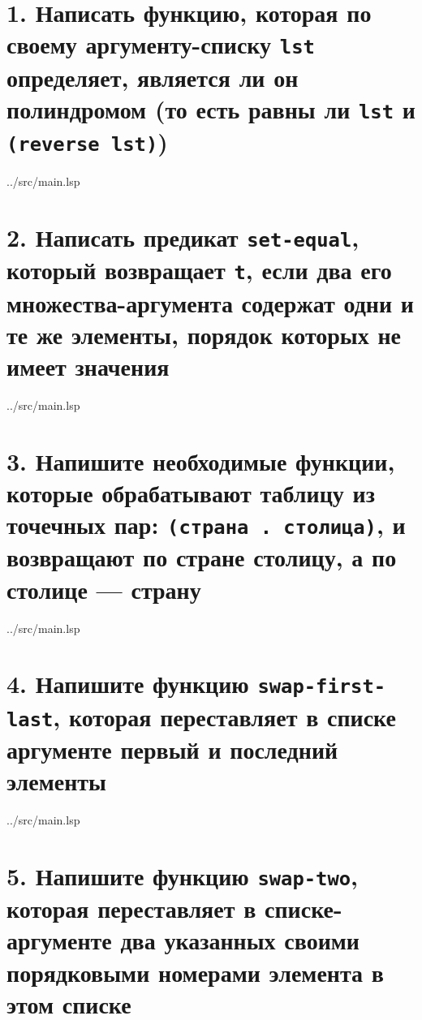 \section*{1. Написать функцию, которая по своему аргументу-списку \texttt{lst} определяет, является ли он полиндромом (то есть равны ли \texttt{lst} и \texttt{(reverse lst)})}

\begin{lstinputlisting}[
	caption={Задание 1},
	label={lst:t1},
	style={lsp},
	linerange={1-2},
	]{../src/main.lsp}
\end{lstinputlisting}

\section*{2. Написать предикат \texttt{set-equal}, который возвращает \texttt{t}, если два его множества-аргумента содержат одни и те же элементы, порядок которых не имеет значения}

\begin{lstinputlisting}[
	caption={Задание 2},
	label={lst:t2},
	style={lsp},
	linerange={4-5},
	]{../src/main.lsp}
\end{lstinputlisting}

\section*{3. Напишите необходимые функции, которые обрабатывают таблицу из точечных пар: \texttt{(страна . столица)}, и возвращают по стране столицу, а по столице --- страну}

\clearpage

\begin{lstinputlisting}[
	caption={Задание 3},
	label={lst:t3},
	style={lsp},
	linerange={7-13},
	]{../src/main.lsp}
\end{lstinputlisting}

\section*{4. Напишите функцию \texttt{swap-first-last}, которая переставляет в списке аргументе первый и последний элементы}

\begin{lstinputlisting}[
	caption={Задание 4},
	label={lst:t4},
	style={lsp},
	linerange={15-25},
	]{../src/main.lsp}
\end{lstinputlisting}

\section*{5. Напишите функцию \texttt{swap-two}, которая переставляет в списке-аргументе два указанных своими порядковыми номерами элемента в этом списке}

